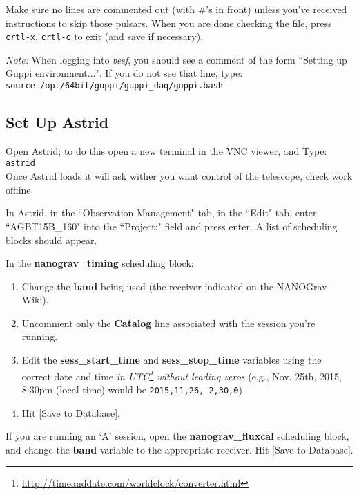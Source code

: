 \documentclass[11pt, reqno, tbtags]{article}
\begin{document}
\noindent Make sure no lines are commented out (with \#'s in front) unless you've received instructions to skip those pulsars. When you are done checking the file, press \texttt{crtl-x}, \texttt{crtl-c} to exit (and save if necessary).  

\noindent\textit{Note:} When logging into \textit{beef}, you should see a comment of the form ``Setting up Guppi environment...".  If you do not see that line, type: \\
\indent\texttt{source /opt/64bit/guppi/guppi\_daq/guppi.bash}

\subsection{Set Up Astrid}\label{ssec:astrid}  %
Open Astrid; to do this open a new terminal in the VNC viewer, and Type: \\
\indent\texttt{astrid} \\
Once Astrid loads it will ask wither you want control of the telescope, check work offline.

\noindent In Astrid, in the ``Observation Management" tab, in the ``Edit" tab, enter ``AGBT15B\_160" into the ``Project:" field and press enter. A list of scheduling blocks should appear. 

\noindent In the \textbf{nanograv\_timing} scheduling block: \begin{enumerate}
 \item Change the \textbf{band} being used (the receiver indicated on the NANOGrav Wiki).  
 \item Uncomment only the \textbf{Catalog} line associated with the session you're running.  
 \item Edit the \textbf{sess\_start\_time} and \textbf{sess\_stop\_time} variables using the correct date and time \textit{in UTC\footnote{\url{http://timeanddate.com/worldclock/converter.html}} without leading zeros} (e.g., Nov. 25th, 2015, 8:30pm (local time) would be \texttt{2015,11,26, 2,30,0}) 
 \item Hit [Save to Database].
\end{enumerate}

\noindent If you are running an `A' session, open the \textbf{nanograv\_fluxcal} scheduling block, and change the \textbf{band} variable to the appropriate receiver.  Hit [Save to Database].
\end{document}
